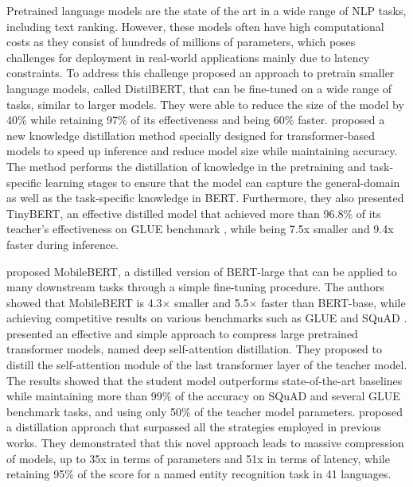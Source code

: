 \documentclass[sigconf,nonacm]{acmart}
\begin{document}
Pretrained language models are the state of the art in a wide range of NLP tasks, including text ranking. However, these models often have high computational costs as they consist of hundreds of millions of parameters, which poses challenges for deployment in real-world applications mainly due to latency constraints. To address this challenge \citet{distilbert} proposed an approach to pretrain smaller language models, called DistilBERT, that can be fine-tuned on a wide range of tasks, similar to larger models. They were able to reduce the size of the model by 40\% while retaining 97\% of its effectiveness and being 60\% faster. \citet{tinybert} proposed a new knowledge distillation method specially designed for transformer-based models to speed up inference and reduce model size while maintaining accuracy. The method performs the distillation of knowledge in the pretraining and task-specific learning stages to ensure that the model can capture the general-domain as well as the task-specific knowledge in BERT. Furthermore, they also presented TinyBERT, an effective distilled model that achieved more than 96.8\% of its teacher's effectiveness on GLUE benchmark \cite{glue}, while being 7.5x smaller and 9.4x faster during inference. 

\citet{mobileBERT} proposed MobileBERT, a distilled version of BERT-large that can be applied to many downstream tasks through a simple fine-tuning procedure. The authors showed that MobileBERT is 4.3× smaller and 5.5× faster than BERT-base, while achieving competitive results on various benchmarks such as GLUE \cite{glue} and SQuAD \cite{squad2018}. \citet{minilm} presented an effective and simple approach to compress large pretrained transformer models, named deep self-attention distillation. They proposed to distill the self-attention module of the last transformer layer of the teacher model. The results showed that the student model outperforms state-of-the-art baselines while maintaining more than 99\% of the accuracy on SQuAD and several GLUE benchmark tasks, and using only 50\% of the teacher model parameters. \citet{xtremedistil} proposed a distillation approach that surpassed all the strategies employed in previous works. They demonstrated that this novel approach leads to massive compression of models, up to 35x in terms of parameters and 51x in terms of latency, while retaining 95\% of the score for a named entity recognition task in 41 languages.
\end{document}
